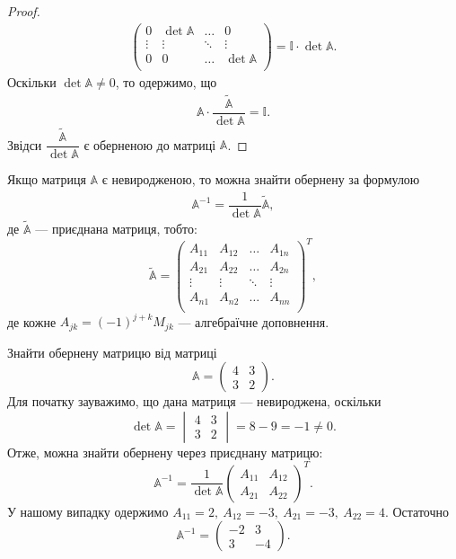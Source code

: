 \documentclass{math_library}
\begin{document}
\begin{proof}
\begin{align*}
\begin{pmatrix}
0 & \det \mathbb{A} & \dots & 0 \\
\vdots & \vdots & \ddots & \vdots \\
0 & 0 & \dots & \det \mathbb{A} \\
\end{pmatrix} = \mathbb{I} \cdot \det \mathbb{A}.
\end{align*}
Оскільки $\det \mathbb{A} \neq 0$, то одержимо, що
\begin{align*}
\mathbb{A} \cdot \dfrac{\widetilde{\mathbb{A}}}{\det \mathbb{A}} = \mathbb{I}.
\end{align*}
Звідси $\dfrac{\widetilde{\mathbb{A}}}{\det \mathbb{A}}$ є оберненою до матриці $\mathbb{A}$.
\end{proof}

\begin{corollary}
Якщо матриця $\mathbb{A}$ є невиродженою, то можна знайти обернену за формулою
\begin{align*}
\mathbb{A}^{-1} = \dfrac{1}{\det \mathbb{A}} \widetilde{\mathbb{A}},
\end{align*}
де $\widetilde{\mathbb{A}}$ --- приєднана матриця, тобто:
\[
\widetilde{\mathbb{A}} = \begin{pmatrix}
A_{11} & A_{12} & \dots & A_{1n} \\
A_{21} & A_{22} & \dots & A_{2n} \\
\vdots & \vdots & \ddots & \vdots \\
A_{n1} & A_{n2} & \dots & A_{nn} \\
\end{pmatrix}^T,
\]
де кожне $A_{jk} = (-1)^{j+k}M_{jk}$ --- алгебраїчне доповнення.
\end{corollary}

\begin{example}
Знайти обернену матрицю від матриці \[
\mathbb{A} = \begin{pmatrix}
4 & 3 \\
3 & 2
\end{pmatrix}.
\]
Для початку зауважимо, що дана матриця --- невироджена, оскільки
\[
\det \mathbb{A} = \begin{vmatrix}
4 & 3 \\
3 & 2
\end{vmatrix} = 8-9 = -1 \neq 0.
\]
Отже, можна знайти обернену через приєднану матрицю:
\[
\mathbb{A}^{-1} = \dfrac{1}{\det \mathbb{A}} \begin{pmatrix}
A_{11} & A_{12} \\
A_{21} & A_{22}
\end{pmatrix}^T.
\] 
У нашому випадку одержимо $A_{11} = 2,\ A_{12} = -3,\ A_{21} = -3,\ A_{22}=4$. Остаточно 
\[
\mathbb{A}^{-1} = \begin{pmatrix}
-2 & 3 \\
3 & -4
\end{pmatrix}.
\]
\end{example}
\end{document}
